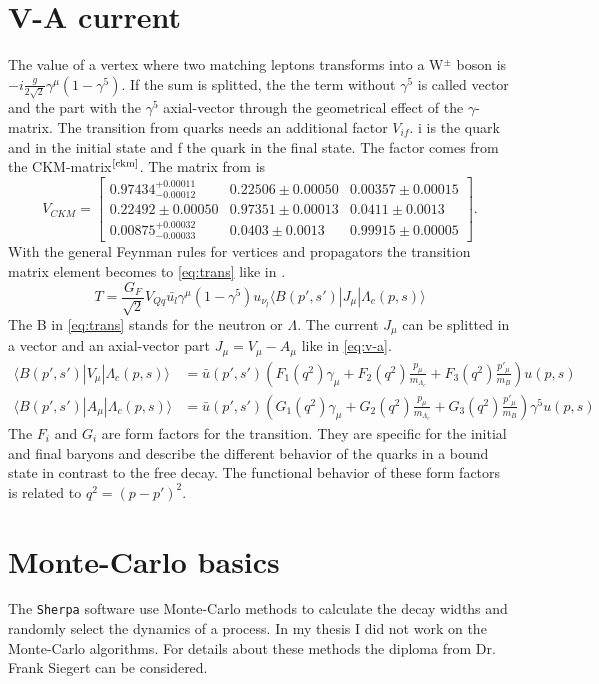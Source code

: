 \section{V-A current} \label{sec:v-a}
The value of a vertex where two matching leptons transforms into a  
W\(^\pm\) boson is \(-i \frac{g}{2\sqrt{2}} \gamma^\mu\left(1-\gamma^5\right)\).
If the sum is splitted, the the term without \(\gamma^5\) is called vector and 
the part with the \(\gamma^5\) axial-vector through the geometrical effect of 
the \(\gamma\)-matrix. The transition from quarks needs an additional factor 
\(V_{if}\). i is the quark and in the initial state and f the quark in the 
final state. The factor comes from the CKM-matrix\(^{\text{\cite{ckm}}}\). The 
matrix from {\cite{ckm}} is
\begin{equation}
  V_{CKM} =
  \begin{bmatrix}
    0.97434^{+0.00011}_{-0.00012} &  0.22506 \pm 0.00050 & 0.00357 \pm 0.00015 \\
    0.22492 \pm 0.00050 & 0.97351 \pm 0.00013 & 0.0411 \pm 0.0013 \\
    0.00875^{+0.00032}_{-0.00033} & 0.0403 \pm 0.0013 & 0.99915 \pm 0.00005
  \end{bmatrix}. \label{eq:ckm}
\end{equation}
With the general Feynman rules for vertices and propagators the transition matrix 
element becomes to {\eqref{eq:trans}} like in {\cite[Eq. 1]{Frank}}.
\begin{equation}
  T = \frac{G_F}{\sqrt{2}} V_{Qq} \bar{u_l}\gamma^\mu\left(1 - \gamma^5\right) 
  u_{\nu_l} \langle B(p', s') | J_\mu | \Lambda_c(p, s) \rangle \label{eq:trans}
\end{equation}
The B in {\eqref{eq:trans}} stands for the neutron or \(\Lambda\). The current 
\(J_\mu\) can be splitted in a vector and an axial-vector part \(J_\mu = V_\mu - 
A_\mu \) like in {\eqref{eq:v-a}}.
\begin{align}
  \langle B(p', s') | V_\mu | \Lambda_c(p, s) \rangle & = \bar{u}(p', s') 
  \left( F_1(q^2) \gamma_\mu + F_2(q^2)\frac{p_\mu}{m_{\Lambda_c}} + 
  F_3(q^2)\frac{p'_\mu}{m_B} \right) u(p, s) \nonumber \\
  \langle B(p', s') | A_\mu | \Lambda_c(p, s) \rangle & = \bar{u}(p', s') 
  \left( G_1(q^2) \gamma_\mu + G_2(q^2)\frac{p_\mu}{m_{\Lambda_c}} + 
  G_3(q^2)\frac{p'_\mu}{m_B} \right) \gamma^5 u(p, s) \label{eq:v-a}
\end{align}
The \(F_i\) and \(G_i\) are form factors for the transition. They are specific 
for the initial and final baryons and describe the different behavior of the 
quarks in a bound state in contrast to the free decay. The functional behavior 
of these form factors is related to \(q^2 = (p - p')^2\).

\section{Monte-Carlo basics}
The \texttt{Sherpa} software use Monte-Carlo methods to calculate the decay
widths and  randomly select the dynamics of a process. In my thesis I did 
not work on the Monte-Carlo algorithms. For details about these methods 
the diploma{\cite{diploma}} from Dr. Frank Siegert can be considered.


